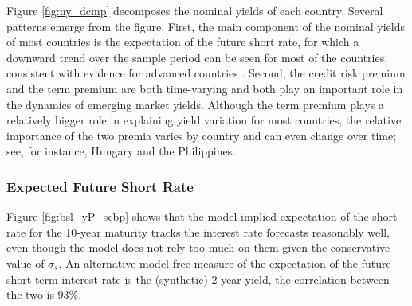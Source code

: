 {%
Figure \ref{fig:ny_dcmp} decomposes the nominal yields of each country.
Several patterns emerge from the figure. 
First, the main component of the nominal yields of most countries is the expectation of the future short rate, for which a downward trend over the sample period can be seen for most of the countries, consistent with evidence for advanced countries \citep{ACDM:2019}.
Second, the credit risk premium and the term premium are both time-varying and both play an important role in the dynamics of emerging market yields.
Although the term premium plays a relatively bigger role 
in explaining yield variation for most countries,
the relative importance of the two premia varies by country and can even change over time; see, for instance, Hungary and the Philippines.


\subsubsection{Expected Future Short Rate}
\iftoggle{toclinks}{\gototoc}{} %

Figure \ref{fig:bsl_yP_scbp} shows that the model-implied expectation of the short rate for the 10-year maturity tracks the interest rate forecasts reasonably well, even though the model does not rely too much on them given the conservative value of \(\sigma_s\).
An alternative model-free measure of the expectation of the future short-term interest rate is the (synthetic) 2-year yield, the correlation between the two is 93\%.

%	

}
